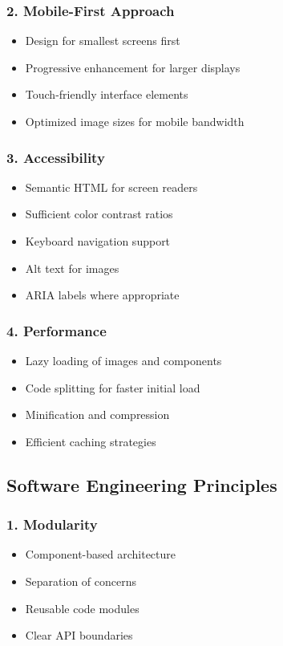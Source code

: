 \documentclass[12pt,a4paper]{report}
\begin{document}
\subsubsection*{2. Mobile-First Approach}
\begin{itemize}
    \item Design for smallest screens first
    \item Progressive enhancement for larger displays
    \item Touch-friendly interface elements
    \item Optimized image sizes for mobile bandwidth
\end{itemize}

\subsubsection*{3. Accessibility}
\begin{itemize}
    \item Semantic HTML for screen readers
    \item Sufficient color contrast ratios
    \item Keyboard navigation support
    \item Alt text for images
    \item ARIA labels where appropriate
\end{itemize}

\subsubsection*{4. Performance}
\begin{itemize}
    \item Lazy loading of images and components
    \item Code splitting for faster initial load
    \item Minification and compression
    \item Efficient caching strategies
\end{itemize}

\subsection*{Software Engineering Principles}

\subsubsection*{1. Modularity}
\begin{itemize}
    \item Component-based architecture
    \item Separation of concerns
    \item Reusable code modules
    \item Clear API boundaries
\end{itemize}
\end{document}
